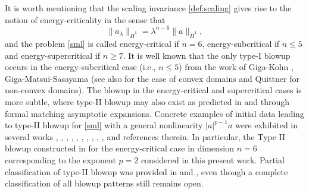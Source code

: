 \documentclass[12pt]{caltech_thesis}
\numberwithin{equation}{section}
\begin{document}
It is worth mentioning that the scaling invariance \eqref{def:scaling} gives rise to the notion of energy-criticality in the sense that 
$$\|a_\lambda\|_{\dot{H}^1} = \lambda^{n - 6}\|a\|_{\dot{H}^1},$$
and the problem \eqref{sml} is called energy-critical if $n = 6$, energy-subcritical if $n \leq 5$ and energy-supercritical if $n \geq 7$. It is well known that the only type-I blowup occurs in the energy-subcritical case (i.e., $n \leq 5$) from the work of Giga-Kohn \cite{GKcpam85, GKiumj87, GKcpam89}, Giga-Matsui-Sasayama \cite{GMSiumj04} {(see also \cite{GMSmmas04} for the case of convex domains and Quittner \cite{Qduke21} for non-convex domains).}  The blowup in the energy-critical and supercritical cases is more subtle, where type-II blowup may also exist as predicted in \cite{HVcrasp94} and \cite{FHVslps00} through formal matching asymptotic expansions. {Concrete examples of initial data leading to type-II blowup for \eqref{sml} with a general nonlinearity $|a|^{p-1}a$ were exhibited in several works \cite{HVpre94}, \cite{Mma07}, \cite{Capde17},  \cite{CMRjams19},  \cite{PMWjfa21}, \cite{Sjfa12}, \cite{PMWam19}, \cite{PMWZdcds20}, \cite{Hihp20}, \cite{PMWZZarx20},  \cite{Hapde20} and references therein. In particular, the Type II blowup constructed in \cite{Hapde20} for the energy-critical case in dimension $n = 6$ corresponding to the exponent $p=2$ considered in this present work.} Partial classification of type-II blowup was provided in  \cite{MMcpam04, MMjfa09} and \cite{CMRcmp17}, even though a complete classification of all blowup patterns still remains open. 
\end{document}
